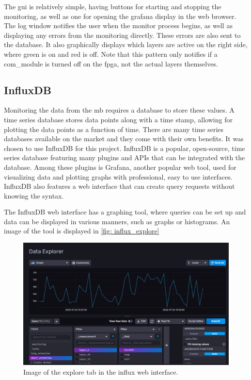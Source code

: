 \documentclass[main.tex]{subfiles}
\begin{document}
The \gls{gui} is relatively simple, having buttons for starting and stopping the monitoring, as well as one for opening the grafana display in the web browser. The log window notifies the user when the monitor process begins, as well as displaying any errors from the monitoring directly. These errors are also sent to the database. It also graphically displays which layers are active on the right side, where green is on and red is off. Note that this pattern only notifies if a com\_module is turned off on the \gls{fpga}, not the actual layers themselves.

\subsection{InfluxDB}
\label{ssec: influxdb}
Monitoring the data from the \gls{mb} requires a database to store these values. A time series database stores data points along with a time stamp, allowing for plotting the data points as a function of time. There are many time series databases available on the market and they come with their own benefits. It was chosen to use InfluxDB for this project. InfluxDB is a popular, open-source, time series database featuring many plugins and APIs that can be integrated with the database. Among these plugins is Grafana, another popular web tool, used for visualizing data and plotting graphs with professional, easy to use interfaces. InfluxDB also features a web interface that can create query requests without knowing the syntax.

The InfluxDB web interface has a graphing tool, where queries can be set up and data can be displayed in various manners, such as graphs or histograms. An image of the tool is displayed in \autoref{fig: influx_explore}

\begin{figure}[!htpb]
    \centering
    \includegraphics[width=17cm, scale=4]{images/influx_explore.png}
    \caption{Image of the explore tab in the influx web interface.}
    \label{fig: influx_explore}
\end{figure}
\FloatBarrier
\end{document}
